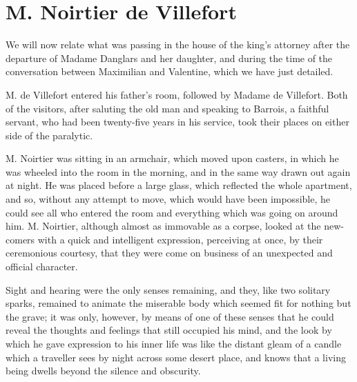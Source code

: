 \chapter{M. Noirtier de Villefort}

We will now relate what was passing in the house of the king’s attorney
after the departure of Madame Danglars and her daughter, and during the
time of the conversation between Maximilian and Valentine, which we
have just detailed.

M. de Villefort entered his father’s room, followed by Madame de
Villefort. Both of the visitors, after saluting the old man and
speaking to Barrois, a faithful servant, who had been twenty-five years
in his service, took their places on either side of the paralytic.

M. Noirtier was sitting in an armchair, which moved upon casters, in
which he was wheeled into the room in the morning, and in the same way
drawn out again at night. He was placed before a large glass, which
reflected the whole apartment, and so, without any attempt to move,
which would have been impossible, he could see all who entered the room
and everything which was going on around him. M. Noirtier, although
almost as immovable as a corpse, looked at the new-comers with a quick
and intelligent expression, perceiving at once, by their ceremonious
courtesy, that they were come on business of an unexpected and official
character.

Sight and hearing were the only senses remaining, and they, like two
solitary sparks, remained to animate the miserable body which seemed
fit for nothing but the grave; it was only, however, by means of one of
these senses that he could reveal the thoughts and feelings that still
occupied his mind, and the look by which he gave expression to his
inner life was like the distant gleam of a candle which a traveller
sees by night across some desert place, and knows that a living being
dwells beyond the silence and obscurity.

